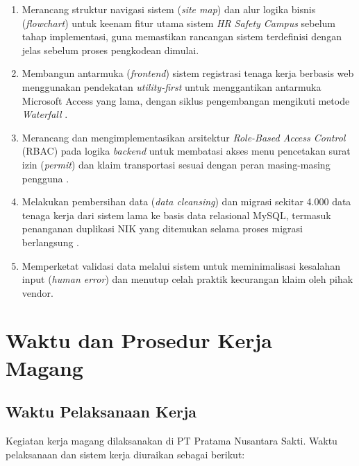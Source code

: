 \begin{enumerate}
    \item Merancang struktur navigasi sistem (\textit{site map}) dan alur logika bisnis (\textit{flowchart}) untuk keenam fitur utama sistem \textit{HR Safety Campus} sebelum tahap implementasi, guna memastikan rancangan sistem terdefinisi dengan jelas sebelum proses pengkodean dimulai.
    \item Membangun antarmuka (\textit{frontend}) sistem registrasi tenaga kerja berbasis web menggunakan pendekatan \textit{utility-first} \cite{nandan2024tailwind} untuk menggantikan antarmuka Microsoft Access yang lama, dengan siklus pengembangan mengikuti metode \textit{Waterfall} \cite{ardiyanto2023waterfall}.
    \item Merancang dan mengimplementasikan arsitektur \textit{Role-Based Access Control} (RBAC) pada logika \textit{backend} untuk membatasi akses menu pencetakan surat izin (\textit{permit}) dan klaim transportasi sesuai dengan peran masing-masing pengguna \cite{mary2025rbac}.
    \item Melakukan pembersihan data (\textit{data cleansing}) dan migrasi
    sekitar 4.000 data tenaga kerja dari sistem lama ke basis data relasional
    MySQL, termasuk penanganan duplikasi NIK yang ditemukan selama proses
    migrasi berlangsung \cite{ravikanth2024deduplication}.
    \item Memperketat validasi data melalui sistem untuk meminimalisasi kesalahan
    input (\textit{human error}) dan menutup celah praktik kecurangan klaim
    oleh pihak vendor.
\end{enumerate}
 
\section{Waktu dan Prosedur Kerja Magang}
 
\subsection{Waktu Pelaksanaan Kerja}
 
\medskip
 
Kegiatan kerja magang dilaksanakan di PT Pratama Nusantara Sakti. Waktu
pelaksanaan dan sistem kerja diuraikan sebagai berikut:
 
\vspace{0.5em}
 
